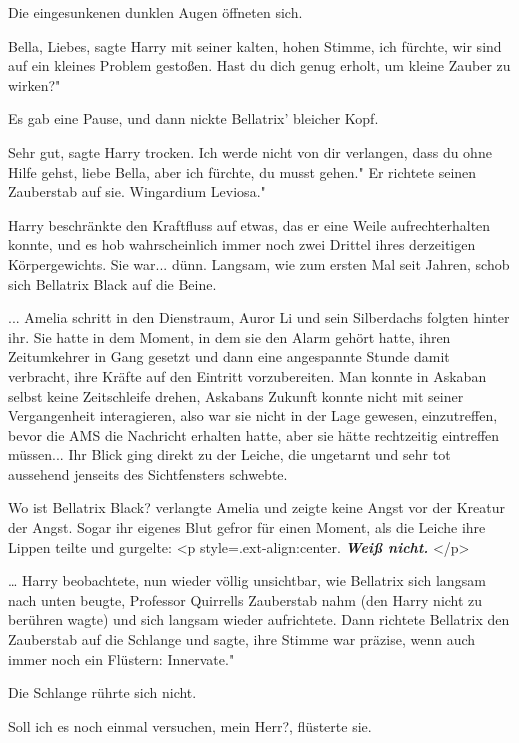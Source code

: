 Die eingesunkenen dunklen Augen öffneten sich.

\glqq Bella, Liebes\grqq{}, sagte Harry mit seiner kalten, hohen Stimme, \glqq
ich fürchte, wir sind auf ein kleines Problem gestoßen. Hast du dich genug
erholt, um kleine Zauber zu wirken?"

Es gab eine Pause, und dann nickte Bellatrix' bleicher Kopf.

\glqq Sehr gut\grqq{}, sagte Harry trocken. \glqq Ich werde nicht von dir
verlangen, dass du ohne Hilfe gehst, liebe Bella, aber ich fürchte, du musst
gehen." Er richtete seinen Zauberstab auf sie. \glqq Wingardium Leviosa."

Harry beschränkte den Kraftfluss auf etwas, das er eine Weile aufrechterhalten
konnte, und es hob wahrscheinlich immer noch zwei Drittel ihres derzeitigen
Körpergewichts. Sie war... dünn. Langsam, wie zum ersten Mal seit Jahren, schob
sich Bellatrix Black auf die Beine.


... Amelia schritt in den Dienstraum, Auror Li und sein Silberdachs folgten
hinter ihr. Sie hatte in dem Moment, in dem sie den Alarm gehört hatte, ihren
Zeitumkehrer in Gang gesetzt und dann eine angespannte Stunde damit verbracht,
ihre Kräfte auf den Eintritt vorzubereiten. Man konnte in Askaban selbst keine
Zeitschleife drehen, Askabans Zukunft konnte nicht mit seiner Vergangenheit
interagieren, also war sie nicht in der Lage gewesen, einzutreffen, bevor die
AMS die Nachricht erhalten hatte, aber sie hätte rechtzeitig eintreffen
müssen... Ihr Blick ging direkt zu der Leiche, die ungetarnt und sehr tot
aussehend jenseits des Sichtfensters schwebte.

\glqq Wo ist Bellatrix Black?\grqq{} verlangte Amelia und zeigte keine Angst vor
der Kreatur der Angst. Sogar ihr eigenes Blut gefror für einen Moment, als die
Leiche ihre Lippen teilte und gurgelte: <p
style=\grqq{}.ext-align:center\grqq{}. \textbf{\emph{ \glqq Weiß nicht.\grqq{}
}}</p>


… Harry beobachtete, nun wieder völlig unsichtbar, wie Bellatrix sich langsam
nach unten beugte, Professor Quirrells Zauberstab nahm (den Harry nicht zu
berühren wagte) und sich langsam wieder aufrichtete. Dann richtete Bellatrix den
Zauberstab auf die Schlange und sagte, ihre Stimme war präzise, wenn auch immer
noch ein Flüstern: \glqq Innervate."

Die Schlange rührte sich nicht.

\glqq Soll ich es noch einmal versuchen, mein Herr?\grqq{}, flüsterte sie.

